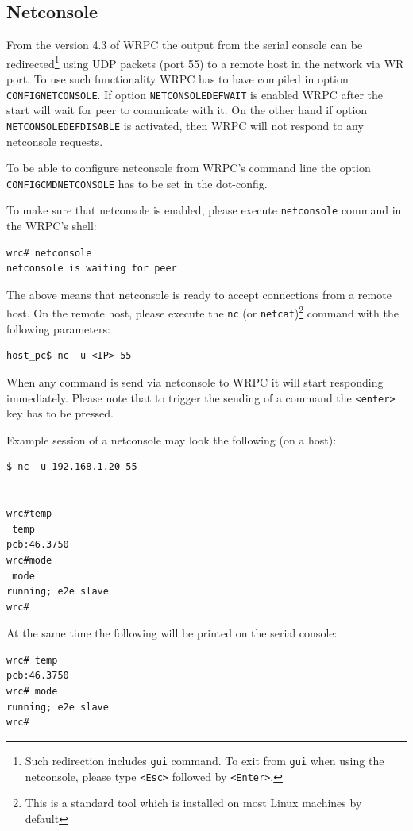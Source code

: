 \documentclass[a4paper, 12pt]{article}
\renewcommand{\_}{\underscore\allowbreak}
\begin{document}
\subsection{Netconsole}
\label{Netconsole}
From the version 4.3 of WRPC the output from the serial console can be
redirected\footnote{Such redirection includes \texttt{gui} command.
To exit from \texttt{gui} when using the netconsole, please type
\texttt{<Esc>} followed by \texttt{<Enter>}.}
using UDP packets (port 55) to a remote host in the network via WR port. To use such
functionality WRPC has to have compiled in option \texttt{CONFIG\_NETCONSOLE}.
If option \texttt{NETCONSOLE\_DEF\_WAIT} is enabled WRPC after the start will
wait for peer to comunicate with it. On the other hand if option
\texttt{NETCONSOLE\_DEF\_DISABLE} is activated, then WRPC will not respond
to any netconsole requests.

To be able to configure netconsole from WRPC's command line the option
\texttt{CONFIG\_CMD\_NETCONSOLE} has to be set in the dot-config.

To make sure that netconsole is enabled, please execute \texttt{netconsole}
command in the WRPC's shell:
\begin{lstlisting}
wrc# netconsole
netconsole is waiting for peer
\end{lstlisting}
The above means that netconsole is ready to accept connections from a remote
host. On the remote host, please execute the \texttt{nc}
(or \texttt{netcat})\footnote{This is a standard tool which is installed on
most Linux machines by default} command with the following parameters:
\begin{lstlisting}
host_pc$ nc -u <IP> 55
\end{lstlisting}
When any command is send via netconsole to WRPC it will start responding
immediately. Please note that to trigger the sending of a command the
\texttt{<enter>} key has to be pressed.

Example session of a netconsole may look the following (on a host):
\begin{lstlisting}
$ nc -u 192.168.1.20 55


wrc#temp
 temp
pcb:46.3750
wrc#mode
 mode
running; e2e slave
wrc#
\end{lstlisting}
At the same time the following will be printed on the serial console:
\begin{lstlisting}
wrc# temp
pcb:46.3750
wrc# mode
running; e2e slave
wrc#
\end{lstlisting}
\end{document}
